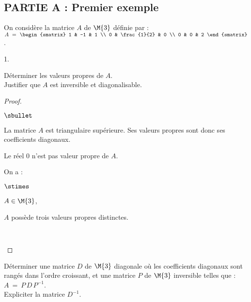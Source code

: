 \documentclass[11pt]{article}%
\begin{document}
\subsection*{PARTIE A : Premier exemple}

\noindent
On considère la matrice $A$ de $\M{3}$ définie par : $A \ = \ 
\begin{smatrix}
  1 & -1 & 1 \\
  0 & \frac{1}{2} & 0 \\
  0 & 0 & 2
\end{smatrix}
$.

\begin{noliste}{1.}
  \setlength{\itemsep}{4mm} %
\item Déterminer les valeurs propres de $A$.\\
  Justifier que $A$ est inversible et diagonalisable.

  \begin{proof}~%
    \begin{noliste}{$\sbullet$}
    \item La matrice $A$ est triangulaire supérieure. Ses valeurs
      propres sont donc ses coefficients diagonaux. %

    \item Le réel $0$ n'est pas valeur propre de $A$. %

    \item On a :
      \begin{noliste}{$\stimes$}
      \item $A \in \M{3}$,
      \item $A$ possède trois valeurs propres distinctes.
      \end{noliste}
      ~\\[-1.65cm]
    \end{noliste}
  \end{proof}

\item Déterminer une matrice $D$ de $\M{3}$ diagonale où les
  coefficients diagonaux sont rangés dans l'ordre croissant, et une
  matrice $P$ de $\M{3}$ inversible telles que : $A \ = \ P \, D \,
  P^{-1}$.\\
  Expliciter la matrice $D^{-1}$.
  

\end{noliste}
\end{document}
